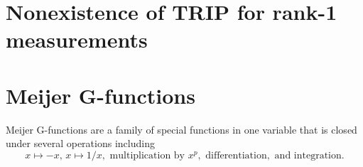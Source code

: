 
\section{Nonexistence of TRIP for rank-1 measurements}
\label{sub:tensors.trip}


\section{Meijer G-functions}%
\label{sub:tensors.meijer}

Meijer G-functions are a family of special functions in one variable that is closed under several operations including
\[
  x \mapsto -x, \,
  x \mapsto 1/x,
  \text{ multiplication by } x^p,
  \text{ differentiation},
  \text{ and integration}.
\]
%
